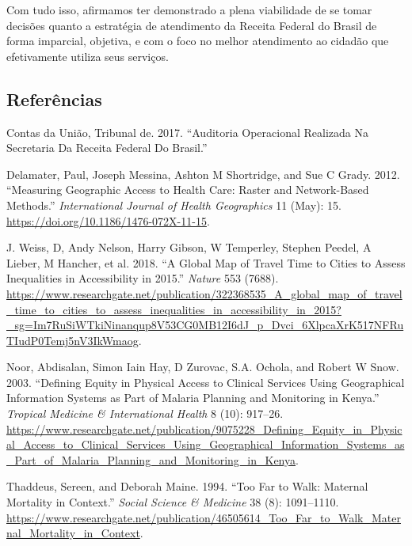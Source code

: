 \documentclass[]{article}
\begin{document}
Com tudo isso, afirmamos ter demonstrado a plena viabilidade de se tomar
decisões quanto a estratégia de atendimento da Receita Federal do Brasil
de forma imparcial, objetiva, e com o foco no melhor atendimento ao
cidadão que efetivamente utiliza seus serviços.

\hypertarget{referencias}{%
\subsection*{Referências}\label{referencias}}

\hypertarget{refs}{}
\leavevmode\hypertarget{ref-tribunal_de_contas_da_uniao_auditoria_2017}{}%
Contas da União, Tribunal de. 2017. ``Auditoria Operacional Realizada Na
Secretaria Da Receita Federal Do Brasil.''

\leavevmode\hypertarget{ref-delamater_measuring_2012}{}%
Delamater, Paul, Joseph Messina, Ashton M Shortridge, and Sue C Grady.
2012. ``Measuring Geographic Access to Health Care: Raster and
Network-Based Methods.'' \emph{International Journal of Health
Geographics} 11 (May): 15.
\url{https://doi.org/10.1186/1476-072X-11-15}.

\leavevmode\hypertarget{ref-j._weiss_global_2018}{}%
J. Weiss, D, Andy Nelson, Harry Gibson, W Temperley, Stephen Peedel, A
Lieber, M Hancher, et al. 2018. ``A Global Map of Travel Time to Cities
to Assess Inequalities in Accessibility in 2015.'' \emph{Nature} 553
(7688).
\url{https://www.researchgate.net/publication/322368535_A_global_map_of_travel_time_to_cities_to_assess_inequalities_in_accessibility_in_2015?_sg=Im7RuSiWTkiNinanqup8V53CG0MB12I6dJ_p_Dvci_6XlpcaXrK517NFRuTIudP0Temj5nV3IkWmaog}.

\leavevmode\hypertarget{ref-noor_defining_2003}{}%
Noor, Abdisalan, Simon Iain Hay, D Zurovac, S.A. Ochola, and Robert W
Snow. 2003. ``Defining Equity in Physical Access to Clinical Services
Using Geographical Information Systems as Part of Malaria Planning and
Monitoring in Kenya.'' \emph{Tropical Medicine \& International Health}
8 (10): 917--26.
\url{https://www.researchgate.net/publication/9075228_Defining_Equity_in_Physical_Access_to_Clinical_Services_Using_Geographical_Information_Systems_as_Part_of_Malaria_Planning_and_Monitoring_in_Kenya}.

\leavevmode\hypertarget{ref-thaddeus_too_1994}{}%
Thaddeus, Sereen, and Deborah Maine. 1994. ``Too Far to Walk: Maternal
Mortality in Context.'' \emph{Social Science \& Medicine} 38 (8):
1091--1110.
\url{https://www.researchgate.net/publication/46505614_Too_Far_to_Walk_Maternal_Mortality_in_Context}.
\end{document}
